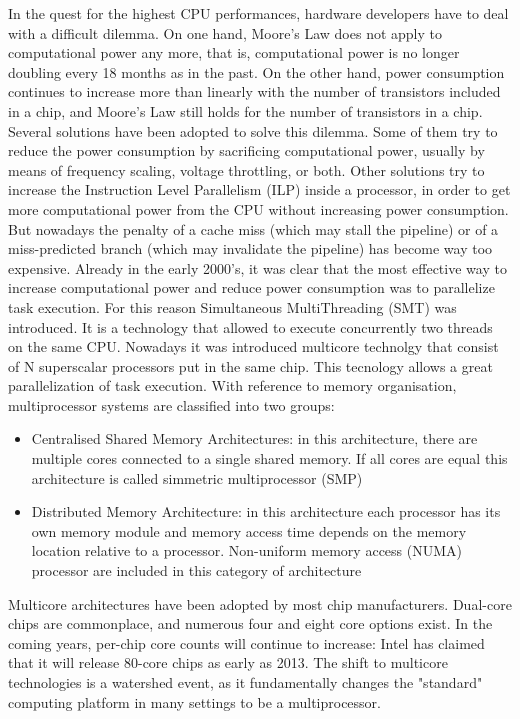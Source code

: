 In the quest for the highest CPU performances, hardware developers have to deal with a difficult dilemma. On one hand, Moore's Law does not apply to 
computational power any more, that is, computational power is no longer doubling every 18 months as in the past. On the other hand, power consumption 
continues to increase more than linearly with the number of transistors included in a chip, and Moore's Law still holds for the number of transistors 
in a chip.
Several solutions have been adopted to solve this dilemma. Some of them try to reduce the power consumption by sacrificing computational power,
usually by means of frequency scaling, voltage throttling, or both. Other solutions try to increase the Instruction Level Parallelism (ILP) inside a 
processor, in order to get more computational power from the CPU without increasing power consumption. But nowadays the penalty of a cache miss 
(which may stall the pipeline) or of a miss-predicted branch (which may invalidate the pipeline) has become way too expensive.
Already in the early 2000's, it was clear that the most effective way to increase computational power and reduce power consumption was to parallelize
task execution. For this reason Simultaneous MultiThreading (SMT) was introduced. It is a technology that allowed to execute 
concurrently two threads on the same CPU. Nowadays it was introduced multicore
technolgy that consist of N superscalar processors put in the same chip. This tecnology allows a great parallelization of task execution.
With reference to memory organisation, multiprocessor systems are classified into two groups:

\begin{itemize}
	\item Centralised Shared Memory Architectures: in this architecture, there are multiple cores connected to a single shared memory. If all cores are
	      equal this architecture is called simmetric multiprocessor (SMP)
	\item Distributed Memory Architecture: in this architecture each processor has its own memory module and memory access time depends on the memory 
	      location relative to a processor. Non-uniform memory access (NUMA) processor are included in this category of architecture
\end{itemize}

Multicore architectures have been adopted by most chip manufacturers. Dual-core chips are commonplace, and numerous four and eight core options exist. 
In the coming years, per-chip core counts will continue to increase: Intel has claimed that it will release 80-core chips as early as 2013. 
The shift to multicore technologies is a watershed event, as it fundamentally changes the "standard" computing platform in many settings to be a 
multiprocessor.

